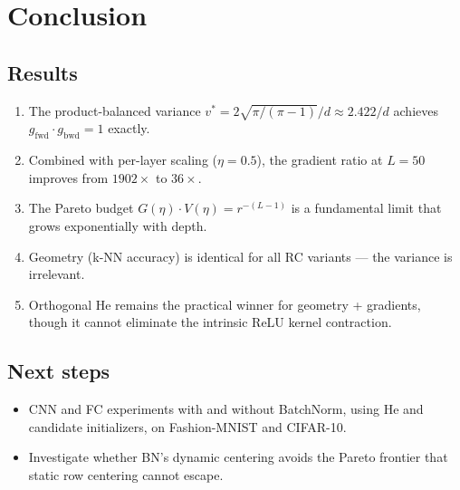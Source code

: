 \documentclass[11pt,a4paper]{article}
\theoremstyle{definition}
\begin{document}
\section{Conclusion}
\label{sec:conclusion}

\subsection{Results}
\begin{enumerate}
  \item The product-balanced variance $v^{\ast} = 2\sqrt{\pi/(\pi-1)}/d \approx 2.422/d$
        achieves $g_{\mathrm{fwd}} \cdot g_{\mathrm{bwd}} = 1$ exactly.
  \item Combined with per-layer scaling ($\eta = 0.5$), the gradient ratio
        at $L = 50$ improves from $1902\times$ to $36\times$.
  \item The Pareto budget $G(\eta) \cdot V(\eta) = r^{-(L-1)}$ is a fundamental
        limit that grows exponentially with depth.
  \item Geometry (k-NN accuracy) is identical for all RC variants ---
        the variance is irrelevant.
  \item Orthogonal He remains the practical winner for geometry + gradients,
        though it cannot eliminate the intrinsic ReLU kernel contraction.
\end{enumerate}

\subsection{Next steps}
\begin{itemize}
  \item CNN and FC experiments with and without BatchNorm, using He and
        candidate initializers, on Fashion-MNIST and CIFAR-10.
  \item Investigate whether BN's dynamic centering avoids the Pareto
        frontier that static row centering cannot escape.
\end{itemize}
\end{document}
